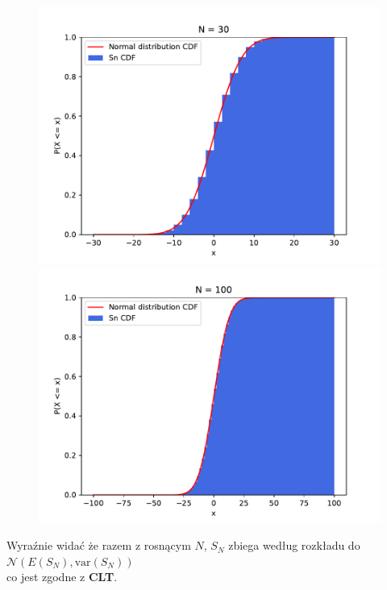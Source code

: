 \documentclass{article}
\begin{document}
\begin{figure}[h!]
    \begin{minipage}{0.45\textwidth}  %
        \centering
        \includegraphics[scale=0.5]{./plots/exc2/n30.pdf}
    \end{minipage}%
    \begin{minipage}{0.45\textwidth}  %
        \centering
        \includegraphics[scale=0.5]{./plots/exc2/n100.pdf}
    \end{minipage}
\end{figure}

Wyraźnie widać że razem z rosnącym \( N \), \( S_N \) zbiega według rozkładu do \( \mathcal{N}\left(E\left(S_N\right), \text{var}\left(S_N\right)\right) \)\\
co jest zgodne z \textbf{CLT}. \\
\end{document}

